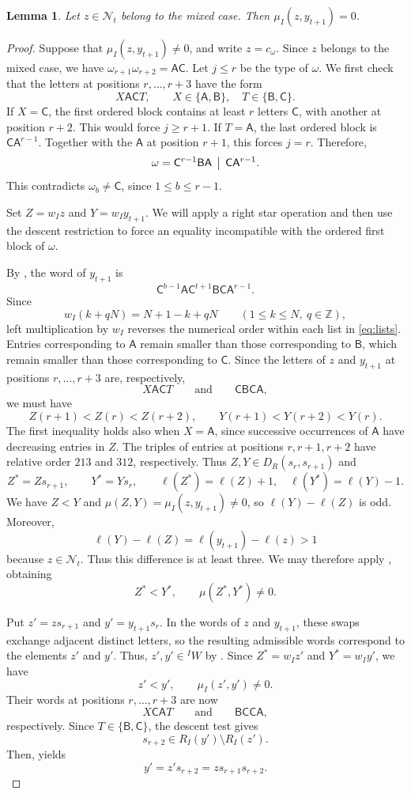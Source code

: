 \documentclass[11pt,a4paper,reqno]{amsart}
\numberwithin{equation}{section}
\newtheorem{lemma}[theorem]{Lemma}
\theoremstyle{definition}
\theoremstyle{remark}
\theoremstyle{plain}
\newcommand{\A}{\mathsf A}
\newcommand{\B}{\mathsf B}
\newcommand{\CC}{\mathsf C}
\newcommand{\mus}{\mu_I}
\begin{document}
\begin{lemma}\label{lem:mixed}
Let $z\in\mathcal N_t$ belong to the mixed case.
Then $\mus(z,y_{t+1})=0$.
\end{lemma}
\begin{proof}
Suppose that $\mus(z,y_{t+1})\ne0$, and write $z=c_\omega$.
Since $z$ belongs to the mixed case, we have
$\omega_{r+1}\omega_{r+2}=\A\CC$.
Let $j\leq r$ be the type of $\omega$.
We first check that the letters at positions $r,\ldots,r+3$ have the form
\[
 X\A\CC T,\qquad X\in\{\A,\B\},\quad T\in\{\B,\CC\}.
\]
If $X=\CC$, the first ordered block contains at least $r$ letters $\CC$, with another at position $r+2$.
This would force $j\geq r+1$.
If $T=\A$, the last ordered block is $\CC\A^{r-1}$. Together with the $\A$ at position $r+1$, this forces $j=r$.
Therefore,
\[
 \omega=\CC^{r-1}\B\A\,\bigm|\,\CC\A^{r-1}.
\]
This contradicts $\omega_b\ne\CC$, since $1\leq b\leq r-1$.

Set $Z=w_Iz$ and $Y=w_Iy_{t+1}$.
We will apply a right star operation and then use the descent restriction to force an equality incompatible with the ordered first block of $\omega$.

By , the word of $y_{t+1}$ is
\[
 \CC^{b-1}\A\CC^{t+1}\B\CC\A^{r-1}.
\]
Since
\[
 w_I(k+qN)=N+1-k+qN
 \qquad(1\leq k\leq N,\ q\in\mathbb Z),
\]
left multiplication by $w_I$ reverses the numerical order within each list in \eqref{eq:lists}.
Entries corresponding to $\A$ remain smaller than those corresponding to $\B$, which remain smaller than those corresponding to $\CC$.
Since the letters of $z$ and $y_{t+1}$ at positions
$r,\ldots,r+3$ are, respectively,
\[
 X\A\CC T
 \qquad\text{and}\qquad
 \CC\B\CC\A,
\]
we must have
\[
Z(r+1)<Z(r)<Z(r+2),
\qquad
Y(r+1)<Y(r+2)<Y(r).
\]
The first inequality holds also when $X=\A$, since successive occurrences of $\A$ have decreasing entries in $Z$.
The triples of entries at positions $r,r+1,r+2$ have relative order $213$ and $312$, respectively.
Thus $Z,Y\in D_R(s_r,s_{r+1})$ and
\[
 Z^*=Zs_{r+1},\qquad Y^*=Ys_r,
 \qquad
 \ell(Z^*)=\ell(Z)+1,\quad
 \ell(Y^*)=\ell(Y)-1.
\]
We have $Z<Y$ and $\mu(Z,Y)=\mus(z,y_{t+1})\ne0$,
so $\ell(Y)-\ell(Z)$ is odd.
Moreover,
\[
 \ell(Y)-\ell(Z)=\ell(y_{t+1})-\ell(z)>1
\]
because $z\in\mathcal N_t$.
Thus this difference is at least three.
We may therefore apply , obtaining
\[
 Z^*<Y^*,\qquad \mu(Z^*,Y^*)\ne0.
\]

Put $z'=zs_{r+1}$ and $y'=y_{t+1}s_r$.
In the words of $z$ and $y_{t+1}$, these swaps exchange adjacent distinct letters, so the resulting admissible words correspond to the elements $z'$ and $y'$.
Thus, $z',y'\in{}^IW$ by .
Since $Z^*=w_Iz'$ and $Y^*=w_Iy'$, we have
\[
 z'<y',\qquad \mus(z',y')\ne0.
\]
Their words at positions $r,\ldots,r+3$ are now
\[
 X\CC\A T
 \qquad\text{and}\qquad
 \B\CC\CC\A,
\]
respectively.
Since $T\in\{\B,\CC\}$, the descent test  gives
\[
 s_{r+2}\in R_I(y')\setminus R_I(z').
\]
Then,  yields
\[
 y'=z's_{r+2}=zs_{r+1}s_{r+2}.
\]


\end{proof}
\end{document}

